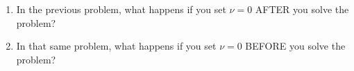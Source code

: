 \begin{enumerate}
\item In the previous problem, what happens if you set $\nu=0$ AFTER you solve
the problem?
\item In that same problem, what happens if you set $\nu=0$ BEFORE you solve the
problem?
\end{enumerate}
